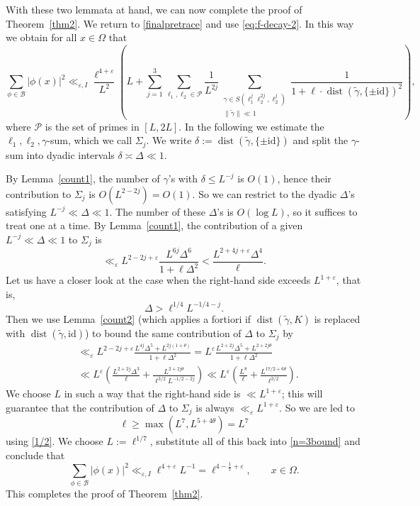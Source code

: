 \documentclass[11pt,oneside]{amsart}
\numberwithin{equation}{section}
\theoremstyle{remark}
\theoremstyle{plain}
\DeclareMathOperator{\dist}{dist}
\newcommand\id{\mathrm{id}}
\newcommand{\mcB}{\mathcal{B}}
\newcommand{\mcP}{\mathcal{P}}
\newcommand\eps{\varepsilon}
\renewcommand\leq{\leqslant}
\renewcommand\geq{\geqslant}
\begin{document}
With these two lemmata at hand, we can now complete the proof of Theorem~\ref{thm2}. We return to \eqref{finalpretrace} and use \eqref{eq:f-decay-2}. In this way we obtain for all $x\in\Omega$ that
\begin{equation}\label{n=3bound}
\sum_{\phi\in\mcB} |\phi(x)|^2 \ll_{\eps,I} \frac{\ell^{4+\eps}}{L^2} \left( L + \sum_{j=1}^3 \sum_{\ell_1, \ell_2 \in \mcP} \frac{1}{L^{2j}} \sum_{\substack{ \gamma\in S(\ell_1^j\ell_2^{2j}, \ell_2^j)\\ \| \tilde{\gamma} \| \ll 1}} \frac{1}{1+ \ell \cdot \dist(\tilde{\gamma}, \{\pm\id\})^2} \right),
\end{equation}
where
$\mcP$ is the set of primes in $[L, 2L]$. In the following we estimate the $\ell_1, \ell_2, \gamma$-sum, which we call $\Sigma_j$. We write 
$\delta := \dist(\tilde{\gamma}, \{\pm \id\})$ 
and split the $\gamma$-sum into dyadic intervals $\delta \asymp \Delta \ll 1$. 

By Lemma~\ref{count1}, the number of $\gamma$'s with $\delta\leq L^{-j}$ is $O(1)$, hence their contribution to $\Sigma_j$ is $O(L^{2-2j})=O(1)$. So we can restrict to the dyadic $\Delta$'s satisfying $L^{-j}\ll\Delta\ll 1$. The number of these $\Delta$'s is $O(\log L)$, so it suffices to treat one at a time. By Lemma~\ref{count1}, the contribution of a given $L^{-j}\ll\Delta\ll 1$ to $\Sigma_j$ is
\[\ll_\eps L^{2-2j+\eps} \frac{L^{6j}\Delta^6}{1 + \ell\Delta^2} < \frac{L^{2+4j+\eps}\Delta^4}{\ell}.\]
Let us have a closer look at the case when the right-hand side exceeds $L^{1+\eps}$, that is,
\[\Delta>\ell^{1/4}L^{-1/4-j}.\]
Then we use Lemma~\ref{count2} (which applies a fortiori if $\dist(\tilde{\gamma}, K)$ is replaced with $\dist(\tilde{\gamma}, \id)$) to bound the same contribution of $\Delta$ to $\Sigma_j$ by
\begin{align*}
& \ll_\eps L^{2-2j+\eps} \frac{L^{4j} \Delta^5 + L^{2j(1+\theta)}}{1 + \ell\Delta^2} 
= L^{\eps} \frac{L^{2+2j} \Delta^5 + L^{2+2j\theta}}{1 + \ell\Delta^2} \\
& \ll L^{\eps}\left( \frac{L^{2+2j}\Delta^3}{\ell} + \frac{L^{2+2j\theta}}{\ell^{3/2}L^{-1/2-2j}}\right) 
\ll L^\eps\left(\frac{L^8}{\ell}+\frac{L^{17/2+6\theta}}{\ell^{3/2}}\right).
\end{align*}
We choose $L$ in such a way that the right-hand side is $\ll L^{1+\eps}$; this will guarantee that the contribution of $\Delta$ to $\Sigma_j$ is always $\ll_\eps L^{1+\eps}$. So we are led to
\[\ell\geq\max(L^7,L^{5+4\theta}) = L^7\]
using \eqref{1/2}. 
We  choose   $L:=\ell^{1/7}$, 
substitute all of this back into \eqref{n=3bound} and conclude that
\[\sum_{\phi\in\mcB}|\phi(x)|^2 \ll_{\eps,I}\ell^{4+\eps} L^{-1} = \ell^{4 - \frac{1}{7} + \eps},\qquad x\in\Omega.\]
This completes the proof of Theorem~\ref{thm2}. 
 
\end{document}
